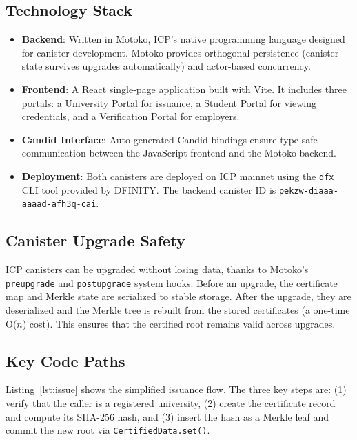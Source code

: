 \documentclass[conference]{IEEEtran}
\begin{document}
\subsection{Technology Stack}

\begin{itemize}[leftmargin=*]
  \item \textbf{Backend}: Written in Motoko, ICP's native programming language designed for canister development. Motoko provides orthogonal persistence (canister state survives upgrades automatically) and actor-based concurrency.
  \item \textbf{Frontend}: A React single-page application built with Vite. It includes three portals: a University Portal for issuance, a Student Portal for viewing credentials, and a Verification Portal for employers.
  \item \textbf{Candid Interface}: Auto-generated Candid bindings ensure type-safe communication between the JavaScript frontend and the Motoko backend.
  \item \textbf{Deployment}: Both canisters are deployed on ICP mainnet using the \texttt{dfx} CLI tool provided by DFINITY. The backend canister ID is \texttt{pekzw-diaaa-aaaad-afh3q-cai}.
\end{itemize}

\subsection{Canister Upgrade Safety}

ICP canisters can be upgraded without losing data, thanks to Motoko's \texttt{preupgrade} and \texttt{postupgrade} system hooks. Before an upgrade, the certificate map and Merkle state are serialized to stable storage. After the upgrade, they are deserialized and the Merkle tree is rebuilt from the stored certificates (a one-time O($n$) cost). This ensures that the certified root remains valid across upgrades.

\subsection{Key Code Paths}

Listing~\ref{lst:issue} shows the simplified issuance flow. The three key steps are: (1) verify that the caller is a registered university, (2) create the certificate record and compute its SHA-256 hash, and (3) insert the hash as a Merkle leaf and commit the new root via \texttt{CertifiedData.set()}.
\end{document}
